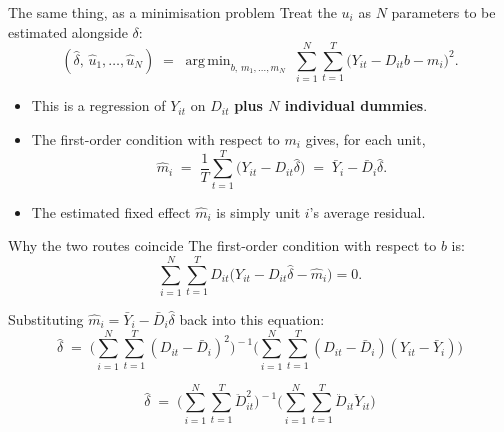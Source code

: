 \documentclass[
  11pt,
  ignorenonframetext,
  aspectratio=169,
]{beamer}
\DeclareMathOperator*{\argmin}{arg\,min}
\begin{document}
\begin{frame}{The same thing, as a minimisation problem}
\protect{}\label{the-same-thing-as-a-minimisation-problem}
Treat the \(u_i\) as \(N\) parameters to be estimated alongside
\(\delta\): \[
(\hat\delta,\, \hat u_1, \dots, \hat u_N) \;=\; \argmin_{b,\, m_1, \dots, m_N} \; \sum_{i=1}^{N} \sum_{t=1}^{T} \big(Y_{it} - D_{it} b - m_i\big)^2 .
\]

\begin{itemize}
\item
  This is a regression of \(Y_{it}\) on \(D_{it}\) \textbf{plus \(N\)
  individual dummies}.
\item
  The first-order condition with respect to \(m_i\) gives, for each
  unit, \[
  \hat m_i \;=\; \frac{1}{T}\sum_{t=1}^{T}\big(Y_{it} - D_{it}\hat\delta\big) \;=\; \bar Y_i - \bar D_i \hat\delta .
  \]
\item
  The estimated fixed effect \(\hat m_i\) is simply unit \(i\)'s average
  residual.
\end{itemize}
\end{frame}

\begin{frame}{Why the two routes coincide}
\protect{}\label{why-the-two-routes-coincide}
The first-order condition with respect to \(b\) is: \[
\sum_{i=1}^{N}\sum_{t=1}^{T} D_{it}\big(Y_{it} - D_{it}\hat\delta - \hat m_i\big) = 0 .
\]

Substituting \(\hat m_i = \bar Y_i - \bar D_i\hat\delta\) back into this
equation: \[
\hat\delta \;=\; \Bigg(\sum_{i=1}^{N}\sum_{t=1}^{T} (D_{it} - \bar D_i)^2\Bigg)^{\!-1}
\Bigg(\sum_{i=1}^{N}\sum_{t=1}^{T} (D_{it} - \bar D_i)(Y_{it} - \bar Y_i)\Bigg)
\]

\[
\hat\delta \;=\; \Bigg(\sum_{i=1}^{N}\sum_{t=1}^{T} \ddot D_{it}^2\Bigg)^{\!-1} \Bigg(\sum_{i=1}^{N}\sum_{t=1}^{T} \ddot D_{it} \ddot Y_{it}\Bigg)
\]
\end{frame}
\end{document}

